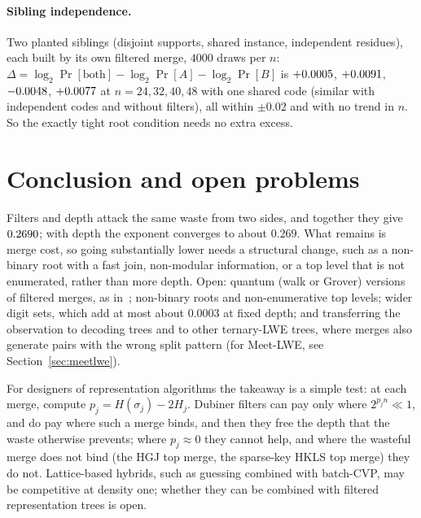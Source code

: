\documentclass[11pt]{article}
\theoremstyle{definition}
\theoremstyle{remark}
\newif\ifincludefloor \includefloorfalse     %
\newif\ifincludemeetlwe \includemeetlwetrue  %
\begin{document}
\paragraph{Sibling independence.} Two planted siblings (disjoint supports, shared instance, independent residues),
each built by its own filtered merge, $4000$ draws per $n$: $\Delta=\log_2\Pr[\text{both}]-\log_2\Pr[A]-\log_2\Pr[B]$
is $+0.0005$, $+0.0091$, $-0.0048$, $+0.0077$ at $n=24,32,40,48$ with
one shared code (similar with independent codes and without filters), all within $\pm0.02$ and with no trend in $n$.
So the exactly tight root condition needs no extra excess.

\ifincludefloor
\section{A list-size floor}\label{sec:floor}

\fi

\ifincludemeetlwe

\fi

\section{Conclusion and open problems}
Filters and depth attack the same waste from two sides, and together they give $0.2690$; with depth the exponent
converges to about $0.269$. What remains is merge cost, so going substantially lower needs a structural change, such
as a non-binary root with a fast join, non-modular information, or a top level that is not enumerated, rather than
more depth. Open: quantum (walk or Grover) versions of filtered merges, as in~\cite{BBSS20}; non-binary roots and non-enumerative
top levels; wider digit sets, which add at most about $0.0003$ at fixed depth; and transferring the
observation to decoding trees and to other ternary-LWE trees, where merges also generate pairs with the wrong split
pattern\ifincludemeetlwe{} (for Meet-LWE, see Section~\ref{sec:meetlwe})\fi.

For designers of representation algorithms the takeaway is a simple test: at each merge, compute
$p_j=H(\sigma_j)-2H_j$. Dubiner filters can pay only where $2^{p_jn}\ll1$, and do pay where such a merge binds,
and then they free the depth that the waste otherwise prevents; where $p_j\approx0$ they cannot help, and where the
wasteful merge does not bind (the HGJ top merge, the sparse-key HKLS top merge) they do not.
Lattice-based hybrids, such as guessing combined with batch-CVP, may be competitive at density one; whether they can be combined with filtered representation trees is open.
\end{document}
